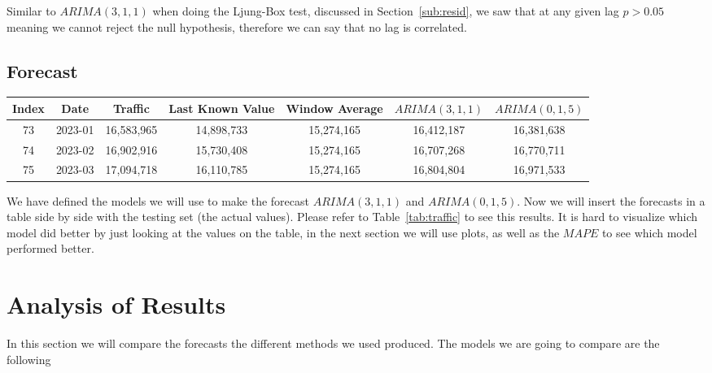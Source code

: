 \documentclass[journal]{IEEEtran}
\begin{document}
Similar to $ARIMA(3,1,1)$ when doing the Ljung-Box test, discussed in
Section~\ref{sub:resid}, we saw that at any given lag $p > 0.05$ meaning we
cannot reject the null hypothesis, therefore we can say that no lag is
correlated.

\subsection{Forecast}

\begin{table*}[htbp]
  \centering
  \caption{Traffic Data}
  \label{tab:traffic}
  \begin{tabular}{|c|c|c|c|c|c|c|}
    \hline
      Index & Date & Traffic & Last Known Value & Window Average & $ARIMA(3,1,1)
$ & $ARIMA(0,1,5)$ \\
    \hline
        73 & 2023-01 & 16,583,965 & 14,898,733 & 15,274,165 & 16,412,187 & 16,381,638 \\
        74 & 2023-02 & 16,902,916 & 15,730,408 & 15,274,165 & 16,707,268 & 16,770,711 \\
        75 & 2023-03 & 17,094,718 & 16,110,785 & 15,274,165 & 16,804,804 & 16,971,533 \\
    \hline
  \end{tabular}
\end{table*}

We have defined the models we will use to make the forecast $ARIMA(3,1,1)$
and $ARIMA(0,1,5)$. Now we will insert the forecasts in a table side by side
with the testing set (the actual values). Please refer to
Table~\ref{tab:traffic} to see this results. It is hard to visualize which
model did better by just looking at the values on the table, in the next
section we will use plots, as well as the $MAPE$ to see which model performed
better.


\section{Analysis of Results}\label{sec:analysis}

In this section we will compare the forecasts the different methods we
used produced. The models we are going to compare are the following
\end{document}
